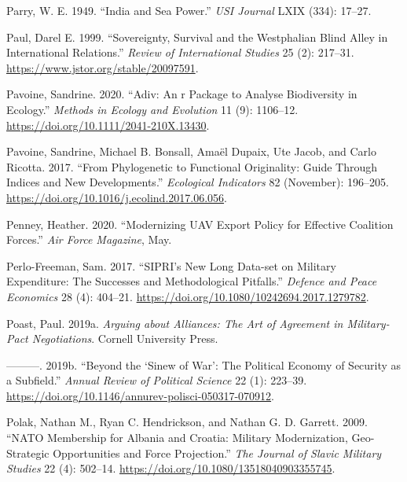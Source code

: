 \documentclass[
  12,
  letterpaper,
  DIV=11,
  numbers=noendperiod]{scrartcl}
\newlength{\cslhangindent}
\newlength{\cslentryspacingunit} %
\newenvironment{CSLReferences}[2] %
 {%
  \setlength{\parindent}{0pt}
  \ifodd #1
  \let\oldpar\par
  \def\par{\hangindent=\cslhangindent\oldpar}
  \fi
  \setlength{\parskip}{#2\cslentryspacingunit}
 }%
 {}
\begin{document}
\begin{CSLReferences}{1}{0}
\leavevmode{}%
Parry, W. E. 1949. {``India and {Sea Power}.''} \emph{USI Journal} LXIX
(334): 17--27.

\leavevmode{}%
Paul, Darel E. 1999. {``Sovereignty, {Survival} and the {Westphalian
Blind Alley} in {International Relations}.''} \emph{Review of
International Studies} 25 (2): 217--31.
\url{https://www.jstor.org/stable/20097591}.

\leavevmode{}%
Pavoine, Sandrine. 2020. {``Adiv: {An} r Package to Analyse Biodiversity
in Ecology.''} \emph{Methods in Ecology and Evolution} 11 (9): 1106--12.
\url{https://doi.org/10.1111/2041-210X.13430}.

\leavevmode{}%
Pavoine, Sandrine, Michael B. Bonsall, Amaël Dupaix, Ute Jacob, and
Carlo Ricotta. 2017. {``From Phylogenetic to Functional Originality:
{Guide} Through Indices and New Developments.''} \emph{Ecological
Indicators} 82 (November): 196--205.
\url{https://doi.org/10.1016/j.ecolind.2017.06.056}.

\leavevmode{}%
Penney, Heather. 2020. {``Modernizing {UAV Export Policy} for {Effective
Coalition Forces}.''} \emph{Air Force Magazine}, May.

\leavevmode{}%
Perlo-Freeman, Sam. 2017. {``{SIPRI}'s {New Long Data-set} on {Military
Expenditure}: {The Successes} and {Methodological Pitfalls}.''}
\emph{Defence and Peace Economics} 28 (4): 404--21.
\url{https://doi.org/10.1080/10242694.2017.1279782}.

\leavevmode{}%
Poast, Paul. 2019a. \emph{Arguing about {Alliances}: {The Art} of
{Agreement} in {Military-Pact Negotiations}}. {Cornell University
Press}.

\leavevmode{}%
---------. 2019b. {``Beyond the {`{Sinew} of {War}'}: {The Political
Economy} of {Security} as a {Subfield}.''} \emph{Annual Review of
Political Science} 22 (1): 223--39.
\url{https://doi.org/10.1146/annurev-polisci-050317-070912}.

\leavevmode{}%
Polak, Nathan M., Ryan C. Hendrickson, and Nathan G. D. Garrett. 2009.
{``{NATO Membership} for {Albania} and {Croatia}: {Military
Modernization}, {Geo-Strategic Opportunities} and {Force Projection}.''}
\emph{The Journal of Slavic Military Studies} 22 (4): 502--14.
\url{https://doi.org/10.1080/13518040903355745}.


\end{CSLReferences}
\end{document}
